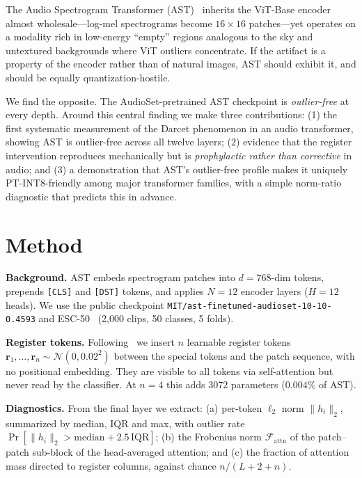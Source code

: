 \documentclass[conference]{IEEEtran}
\begin{document}
The Audio Spectrogram Transformer (AST)~\cite{gong2021ast} inherits the ViT-Base encoder~\cite{dosovitskiy2021image} almost wholesale---log-mel spectrograms become $16\times16$ patches---yet operates on a modality rich in low-energy ``empty'' regions analogous to the sky and untextured backgrounds where ViT outliers concentrate. If the artifact is a property of the encoder rather than of natural images, AST should exhibit it, and should be equally quantization-hostile.

We find the opposite. The AudioSet-pretrained AST checkpoint is \emph{outlier-free} at every depth. Around this central finding we make three contributions: (1) the first systematic measurement of the Darcet phenomenon in an audio transformer, showing AST is outlier-free across all twelve layers; (2) evidence that the register intervention reproduces mechanically but is \emph{prophylactic rather than corrective} in audio; and (3) a demonstration that AST's outlier-free profile makes it uniquely PT-INT8-friendly among major transformer families, with a simple norm-ratio diagnostic that predicts this in advance.

\section{Method}
\textbf{Background.} AST embeds spectrogram patches into $d{=}768$-dim tokens, prepends \texttt{[CLS]} and \texttt{[DST]} tokens, and applies $N{=}12$ encoder layers ($H{=}12$ heads). We use the public checkpoint \texttt{MIT/ast-finetuned-audioset-10-10-0.4593} and ESC-50~\cite{piczak2015esc} (2{,}000 clips, 50 classes, 5 folds).

\textbf{Register tokens.} Following~\cite{darcet2024need} we insert $n$ learnable register tokens $\mathbf{r}_1,\ldots,\mathbf{r}_n\sim\mathcal{N}(0,0.02^2)$ between the special tokens and the patch sequence, with no positional embedding. They are visible to all tokens via self-attention but never read by the classifier. At $n{=}4$ this adds $3072$ parameters ($0.004\%$ of AST).

\textbf{Diagnostics.} From the final layer we extract: (a) per-token $\ell_2$ norm $\lVert h_i\rVert_2$, summarized by median, IQR and max, with outlier rate $\Pr[\lVert h_i\rVert_2 > \mathrm{median}+2.5\,\mathrm{IQR}]$; (b) the Frobenius norm $\mathcal{F}_{\text{attn}}$ of the patch--patch sub-block of the head-averaged attention; and (c) the fraction of attention mass directed to register columns, against chance $n/(L{+}2{+}n)$.
\end{document}
